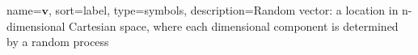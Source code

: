 

{
name={$\mathbf{v}$},
sort={label},
type=symbols,
description={Random vector: a location in n-dimensional Cartesian space, where each dimensional component is determined by a random process}
}